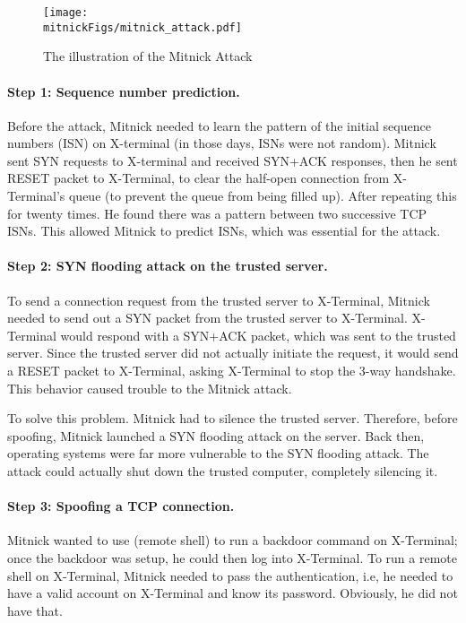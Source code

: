 \begin{figure}[htb]
\centering
\texttt{[image: \\mitnickFigs/mitnick\_attack.pdf]}
\caption{The illustration of the Mitnick Attack}
\label{tcp:mitnick}
\end{figure}


\paragraph{Step 1: Sequence number prediction.} 
Before the attack, Mitnick needed to learn the pattern of the initial sequence numbers (ISN)
on X-terminal (in those days, ISNs were not random). 
Mitnick sent SYN requests to X-terminal and received SYN+ACK responses, 
then he sent
RESET packet to X-Terminal, to clear the half-open connection
from X-Terminal's queue (to prevent the queue from being filled up). After repeating
this for twenty times. He found there was a pattern between two successive
TCP ISNs. This allowed Mitnick to predict ISNs, which was essential for
the attack. 


\paragraph{Step 2: SYN flooding attack on the trusted server.} To
send a connection request from the trusted server to X-Terminal,
Mitnick needed to send out a SYN packet from
the trusted server to X-Terminal. X-Terminal would respond with a
SYN+ACK packet, which was sent to the trusted server. Since the trusted server
did not actually initiate the request, it would send a RESET packet 
to X-Terminal, asking X-Terminal to stop the 3-way handshake. This behavior
caused trouble to the Mitnick attack.

To solve this problem. Mitnick had to silence the trusted server. 
Therefore, before spoofing, Mitnick launched a SYN
flooding attack on the server. Back then, operating systems were far more
vulnerable to the SYN flooding attack.  The attack could actually shut down the
trusted computer, completely silencing it. 


\paragraph{Step 3: Spoofing a TCP connection.} Mitnick wanted to 
use \rsh (remote shell) to run a backdoor command on X-Terminal; once the 
backdoor was setup, he could then log into X-Terminal. 
To run a remote shell on X-Terminal, Mitnick needed to pass the 
authentication, i.e, he needed to have a valid account on X-Terminal and know
its password. Obviously, he did not have that.


